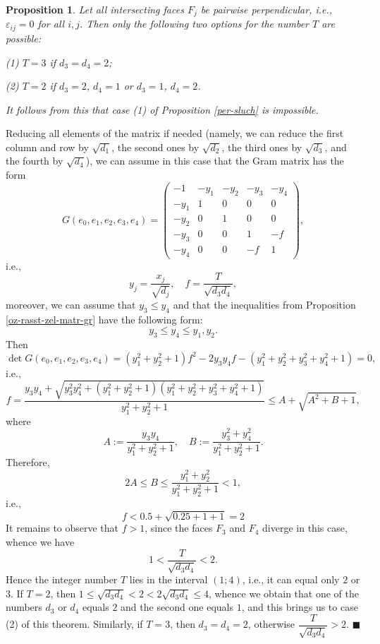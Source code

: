 \documentclass[14pt]{article}
\newtheorem{proposition}{\indent Proposition}[section]
\newenvironment{proof}                    
       {\par\indent{\bf Proof. }} 
	        {\hfill $\scriptstyle\blacksquare$}
\begin{document}
\begin{proposition}\label{sluch-perp}
Let all intersecting faces $F_j$ be pairwise perpendicular,
i.e., $\varepsilon_{ij} = 0$ for all $i,j$.
Then only the following two options for the number $T$ are possible:

(1) $T=3$ if $d_3 = d_4 = 2$;

(2) $T = 2$ if $d_3 = 2$, $d_4 = 1$ or $d_3 = 1$, $d_4 = 2$.

It follows from this that case (1) of Proposition \ref{per-sluch} is impossible.
\end{proposition}
\begin{proof}
Reducing all elements of the matrix if  needed (namely,
we can reduce the first column and row by $\sqrt{d_1}$,
the second  ones by $\sqrt{d_2}$, the third ones by $\sqrt{d_3}$, and the fourth  by
$\sqrt{d_4}$), we can assume in this case that the Gram matrix
 has the form
$$
G(e_0, e_1, e_2, e_3, e_4) =
\begin{pmatrix}
-1 & -y_1 & -y_2 & -y_3 & -y_4\\
-y_1 & 1 & 0 & 0 & 0\\
-y_2 & 0 & 1 & 0 & 0\\
-y_3 & 0  & 0 & 1 & -f\\
-y_4 & 0 & 0 & -f & 1
\end{pmatrix},
$$
i.e.,
$$
y_j = \dfrac{x_j}{\sqrt{d_j}}, \quad f = \dfrac{T}{\sqrt{d_3 d_4}},
$$
moreover, we can assume that $y_3 \le y_4$ and that the  inequalities from Proposition \ref{oz-rasst-zel-matr-gr} have the following form:
$$
y_3 \le y_4 \le y_1, y_2.
$$
Then
$$
\det G(e_0, e_1, e_2, e_3, e_4) = (y_1^2 + y_2^2 + 1)f^2 - 2 y_3 y_4 f
- (y_1^2 + y_2^2 + y_3^2 +
y_4^2 + 1) = 0,
$$
i.e.,
$$
f = \dfrac{y_3 y_4 + \sqrt{y_3^2 y_4^2 + (y_1^2 + y_2^2 + 1)(y_1^2 + y_2^2
+ y_3^2 + y_4^2
+ 1)}}{y_1^2 + y_2^2 + 1} \le A + \sqrt{A^2 + B + 1},
$$
where
$$
A:= \dfrac{y_3 y_4}{y_1^2 + y_2^2 + 1}, \quad B:=  \dfrac{y_3^2
+ y_4^2}{y_1^2 + y_2^2 + 1}.
$$
Therefore,
$$
2A \le B  \le \dfrac{y_1^2 + y_2^2}{y_1^2 + y_2^2 + 1} < 1,
$$
i.e.,
$$
f < 0.5 + \sqrt{0.25 + 1 + 1} = 2
$$
It remains to observe that $f  > 1$, since the faces
$F_3$ and $F_4$ diverge in this case, whence we have
$$
1 < \dfrac{T}{\sqrt{d_3 d_4}} < 2.
$$
Hence the integer number $T$ lies in the interval $(1; 4)$,
i.e., it can equal only  $2$ or $3$.
If $T=2$, then $1 \le \sqrt{d_3 d_4} < 2 < 2\sqrt{d_3 d_4}
 \le 4$, whence we obtain that one
of the numbers $d_3$  or $d_4$ equals $2$ and the second one equals $1$,
and this
brings us to case (2) of this theorem. Similarly, if $T=3$, then $d_3 = d_4 = 2$,
otherwise $\dfrac{T}{\sqrt{d_3 d_4}} > 2$.
\end{proof}
\end{document}
